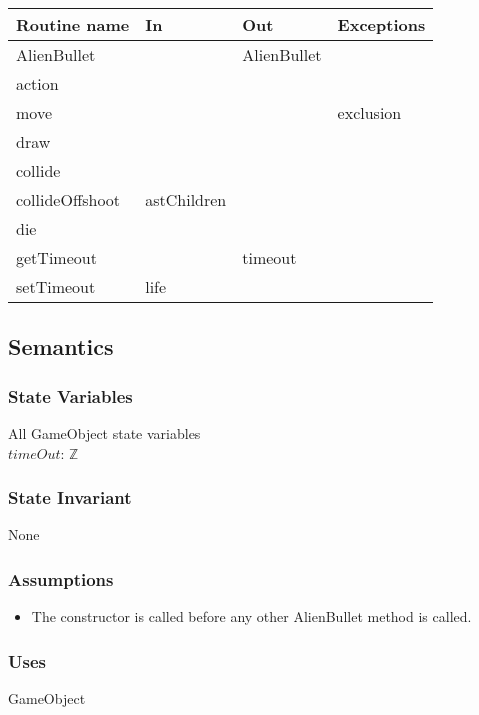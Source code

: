 \documentclass[12pt]{article}
\begin{document}
\begin{tabular}{| l | l | l | l |}
    \hline
    \textbf{Routine name} & \textbf{In} & \textbf{Out} & \textbf{Exceptions}\\
    \hline
    AlienBullet & ~ & AlienBullet & ~\\
    \hline
    action & ~ & ~ & ~\\
    \hline
    move & ~ & ~ & exclusion\\
    \hline
    draw & ~ & ~ & ~\\
    \hline
    collide & ~ & ~ & ~\\
    \hline
    collideOffshoot & astChildren & ~ & ~\\
    \hline
    die & ~ & ~ & ~\\
    \hline
    getTimeout & ~ & timeout & ~\\
    \hline
    setTimeout & life & ~ & ~\\
    \hline
\end{tabular}

\subsection* {Semantics}

\subsubsection* {State Variables}

All GameObject state variables\\
$timeOut$: $\mathbb{Z}$\\

\subsubsection* {State Invariant}

None

\subsubsection* {Assumptions}

\begin{itemize}
  \item The constructor is called before any other AlienBullet method is called.
\end{itemize}

\subsubsection*{Uses}
GameObject
\end{document}

